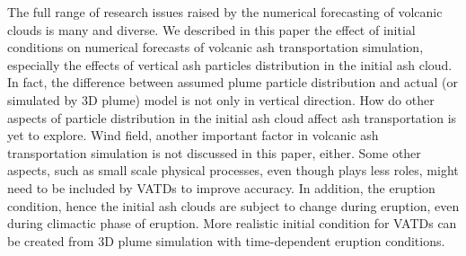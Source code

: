 The full range of research issues raised by the numerical forecasting of volcanic clouds is many and diverse. We described in this paper the effect of initial conditions on numerical forecasts of volcanic ash transportation simulation, especially the effects of vertical ash particles distribution in the initial ash cloud. 
In fact, the difference between assumed plume particle distribution and actual (or simulated by 3D plume) model is not only in vertical direction. How do other aspects of particle distribution in the initial ash cloud affect ash transportation is yet to explore. Wind field, another important factor in volcanic ash transportation simulation is not discussed in this paper, either. Some other aspects, such as small scale physical processes, even though plays less roles, might need to be included by VATDs to improve accuracy. In addition, the eruption condition, hence the initial ash clouds are subject to change during eruption, even during climactic phase of eruption. More realistic initial condition for VATDs can be created from 3D plume simulation with time-dependent eruption conditions.